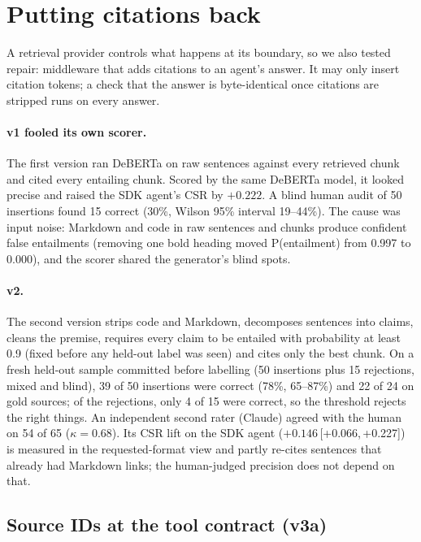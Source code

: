 \documentclass[11pt]{article}
\newcommand{\ci}[2]{\,[#1,\,#2]}
\begin{document}
\section{Putting citations back}
\label{sec:guardrail}

A retrieval provider controls what happens at its boundary, so we also tested repair: middleware
that adds citations to an agent's answer. It may only insert citation tokens; a check that the
answer is byte-identical once citations are stripped runs on every answer.

\paragraph{v1 fooled its own scorer.} The first version ran DeBERTa on raw sentences against every
retrieved chunk and cited every entailing chunk. Scored by the same DeBERTa model, it looked
precise and raised the SDK agent's CSR by $+0.222$. A blind human audit of 50 insertions found
15 correct (30\%, Wilson 95\% interval 19--44\%). The cause was input noise: Markdown and code in
raw sentences and chunks produce confident false entailments (removing one bold heading moved
P(entailment) from 0.997 to 0.000), and the scorer shared the generator's blind spots.

\paragraph{v2.} The second version strips code and Markdown, decomposes sentences into claims,
cleans the premise, requires every claim to be entailed with probability at least 0.9 (fixed
before any held-out label was seen) and cites only the best chunk. On a fresh held-out sample
committed before labelling (50 insertions plus 15 rejections, mixed and blind), 39 of 50
insertions were correct (78\%, 65--87\%) and 22 of 24 on gold sources; of the rejections, only
4 of 15 were correct, so the threshold rejects the right things. An independent second rater
(Claude) agreed with the human on 54 of 65 ($\kappa = 0.68$). Its CSR lift on the SDK agent
($+0.146$\ci{+0.066}{+0.227}) is measured in the requested-format view and partly re-cites
sentences that already had Markdown links; the human-judged precision does not depend on that.

\subsection{Source IDs at the tool contract (v3a)}
\label{sec:v3a}
\end{document}
